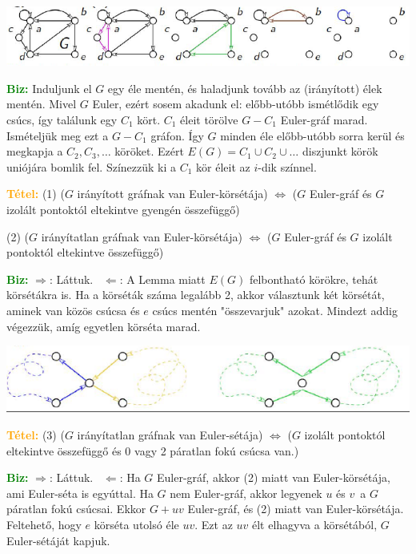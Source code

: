 \documentclass[../../szobeli.tex]{subfiles}
\begin{document}
\begin{itemize}
        \includegraphics[width=\textwidth]{img/2.png}

        \textcolor{green}{\textbf{Biz:}} Induljunk el $G$ egy éle mentén, és haladjunk tovább az (irányított) élek mentén. Mivel $G$ Euler, ezért sosem akadunk el: előbb-utóbb ismétlődik egy csúcs, így találunk egy $C_1$ kört. $C_1$ éleit törölve $G-C_1$ Euler-gráf marad. Ismételjük meg ezt a $G-C_1$ gráfon. Így $G$ minden éle előbb-utóbb sorra kerül és megkapja a $C_2, C_3, \dots$ köröket. Ezért $E(G) = C_1 \cup C_2 \cup \dots$ diszjunkt körök uniójára bomlik fel. Színezzük ki a $C_1$ kör éleit az $i$-dik színnel.  

        \textcolor{orange}{\textbf{Tétel:}} (1) ($G$ irányított gráfnak van Euler-körsétája) $\Longleftrightarrow$ ($G$ Euler-gráf és $G$ izolált pontoktól eltekintve gyengén összefüggő) 
        
        (2) ($G$ irányítatlan gráfnak van Euler-körsétája) $\Longleftrightarrow$ ($G$ Euler-gráf és $G$ izolált pontoktól eltekintve összefüggő)

        \textcolor{green}{\textbf{Biz:}} $\Rightarrow$: Láttuk. \checkmark $\Leftarrow$: A Lemma miatt $E(G)$ felbontható körökre, tehát körsétákra is. Ha a körséták száma legalább 2, akkor választunk két körsétát, aminek van közös csúcsa és $e$ csúcs mentén "összevarjuk" azokat. Mindezt addig végezzük, amíg egyetlen körséta marad.  

        \includegraphics[width=\textwidth]{./img/3.png}

        \textcolor{orange}{\textbf{Tétel:}} (3) ($G$ irányítatlan gráfnak van Euler-sétája) $\Longleftrightarrow$ ($G$ izolált pontoktól eltekintve összefüggő és 0 vagy 2 páratlan fokú csúcsa van.)

        \textcolor{green}{\textbf{Biz:}} $\Rightarrow$: Láttuk. \checkmark $\Leftarrow$: Ha $G$ Euler-gráf, akkor (2) miatt van Euler-körsétája, ami Euler-séta is egyúttal. Ha $G$ nem Euler-gráf, akkor legyenek $u$ és $v$ a $G$ páratlan fokú csúcsai. Ekkor $G + uv$ Euler-gráf, és (2) miatt van Euler-körsétája. Feltehető, hogy $e$ körséta utolsó éle $uv$. Ezt az $uv$ élt elhagyva a körsétából, $G$ Euler-sétáját kapjuk. 


\end{itemize}
\end{document}
